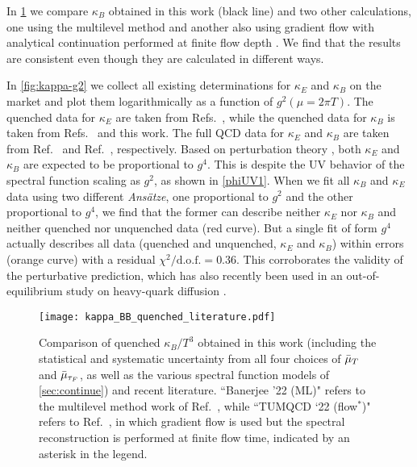 \documentclass[floatfix,twocolumn,prd,showpacs,preprintnumbers,amsmath,nofootinbib,amssymb,superscriptaddress]{revtex4-2}
\def\ccite#1{Ref.~\cite{#1}} %
\def\ccites#1{Refs.~\cite{#1}} %
\begin{document}
In \cref{fig:compare-kappa} we compare $\kappa_B$ obtained in this work (black line) and two other calculations, one using the multilevel method \cite{Banerjee:2022uge} and another also using gradient flow with analytical continuation performed at finite flow depth \cite{Brambilla:2022xbd}.
We find that the results are consistent even though they are calculated in different ways.

In \cref{fig:kappa-g2} we collect all existing determinations for $\kappa_E$ and $\kappa_B$ on the market and plot them logarithmically as a function of $g^2(\mu=2\pi T)$. The quenched data for $\kappa_E$ are taken from \ccites{Francis:2015daa,Altenkort:2020fgs,Banerjee:2022gen,Brambilla:2022xbd,Brambilla:2020siz}, while the quenched data for $\kappa_B$ is taken from \ccites{Brambilla:2022xbd, Banerjee:2022uge} and this work. The full QCD data for $\kappa_E$ and $\kappa_B$ are taken from \ccite{Altenkort:2023oms} and \ccite{Altenkort:2023eav}, respectively. 
Based on perturbation theory \cite{Caron-Huot:2007rwy}, both $\kappa_E$ and $\kappa_B$ are expected to be proportional to $g^4$.
This is despite the UV behavior of the spectral function scaling as $g^2$, as shown in \cref{phiUV1}.
When we fit all $\kappa_B$ and $\kappa_E$ data using two different \textit{Ansätze}, one proportional to $g^2$ and the other proportional to $g^4$, we find that the former can describe neither $\kappa_E$ nor $\kappa_B$ and neither quenched nor unquenched data (red curve).
But a single fit of form $g^4$ actually describes all data (quenched and unquenched, $\kappa_E$ and $\kappa_B$) within errors (orange curve) with a residual $\chi^2/\mathrm{d.o.f.}=0.36$. This corroborates the validity of the perturbative prediction, which has also recently been used in an out-of-equilibrium study on heavy-quark diffusion \cite{Du:2023izb}.


\begin{figure}[t]
    \centering
    \texttt{[image: kappa\_BB\_quenched\_literature.pdf]}
    \caption{Comparison of quenched $\kappa_B/T^3$ obtained in this work (including the statistical and systematic uncertainty from all four choices of $\bar{\mu}_{T}$ and $\bar{\mu}_{\tau_F}$, as well as the various spectral function models of \cref{sec:continue}) and recent literature. ``Banerjee '22 (ML)" refers to the multilevel method work of \ccite{Banerjee:2022uge}, while ``TUMQCD `22 (flow$^*$)" refers to \ccite{Brambilla:2022xbd}, in which gradient flow is used but the spectral reconstruction is performed at finite flow time, indicated by an asterisk in the legend. 
    }
    \label{fig:compare-kappa}
\end{figure}
\end{document}
